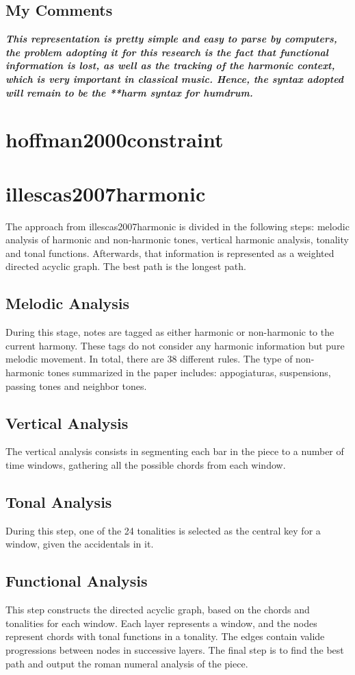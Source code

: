   \subsection{My Comments}
    \emph{\textbf{
      This representation is pretty simple and easy to parse by computers, the problem adopting it for this research is the fact that functional information is lost, as well as the tracking of the harmonic context, which is very important in classical music. Hence, the syntax adopted will remain to be the **harm syntax for humdrum.
    }}
\section{hoffman2000constraint }
\section{illescas2007harmonic }
  The approach from illescas2007harmonic is divided in the following steps: melodic analysis of harmonic and non-harmonic tones, vertical harmonic analysis, tonality and tonal functions. Afterwards, that information is represented as a weighted directed acyclic graph. The best path is the longest path.
  \subsection{Melodic Analysis}
    During this stage, notes are tagged as either harmonic or non-harmonic to the current harmony. These tags do not consider any harmonic information but pure melodic movement.
    In total, there are 38 different rules. The type of non-harmonic tones summarized in the paper includes: appogiaturas, suspensions, passing tones and neighbor tones.
  \subsection{Vertical Analysis}
    The vertical analysis consists in segmenting each bar in the piece to a number of time windows, gathering all the possible chords from each window.
  \subsection{Tonal Analysis}
    During this step, one of the 24 tonalities is selected as the central key for a window, given the accidentals in it.
  \subsection{Functional Analysis}
    This step constructs the directed acyclic graph, based on the chords and tonalities for each window. Each layer represents a window, and the nodes represent chords with tonal functions in a tonality. The edges contain valide progressions between nodes in successive layers. The final step is to find the best path and output the roman numeral analysis of the piece.
